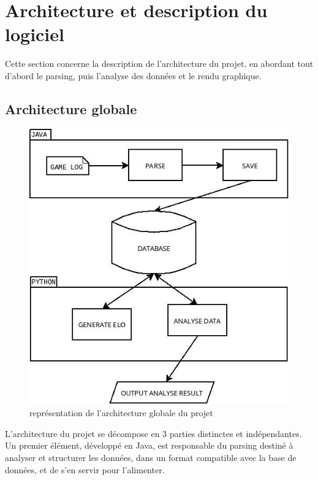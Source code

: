 \chapter{Architecture et description du logiciel}
Cette section concerne la description de l'architecture du projet, en abordant tout d'abord le parsing, puis l'analyse des données et le rendu graphique.


\section{Architecture globale}

\begin{figure}[!h]
  \begin{center}
    \includegraphics[scale=0.45, keepaspectratio]{./presentation/overview.jpg}
  \end{center}
  \caption{représentation de l'architecture globale du projet}
\end{figure}

L'architecture du projet se décompose en 3 parties distinctes et indépendantes. Un premier élément, développé en Java, est responsable du parsing destiné à analyser et structurer les données, dans un format compatible avec la base de données, et de s'en servir pour l'alimenter. 


